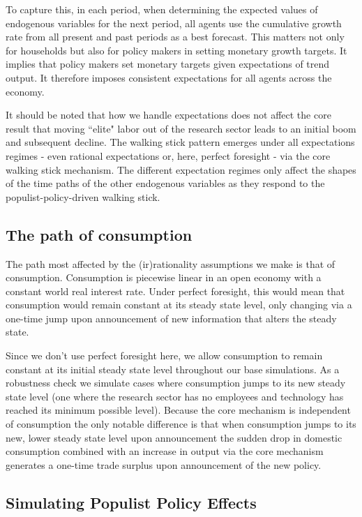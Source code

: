 \documentclass{OUP-EJ}
\begin{document}
To capture this, in each period, when determining the expected values of endogenous variables for the next period, all agents use the cumulative growth rate from all present and past periods as a best forecast. This matters not only for households but also for policy makers in setting monetary growth targets.  It implies that policy makers set monetary targets given expectations of trend output.  It therefore imposes consistent expectations for all agents across the economy.

It should be noted that how we handle expectations does not affect the core result that moving ``elite" labor out of the research sector leads to an initial boom and subsequent decline.  The walking stick pattern emerges under all expectations regimes - even rational expectations or, here, perfect foresight - via the core walking stick mechanism.  The different expectation regimes only affect the shapes of the time paths of the other endogenous variables as they respond to the populist-policy-driven walking stick.

\subsection{The path of consumption}

The path most affected by the (ir)rationality assumptions we make is that of consumption.  Consumption is piecewise linear in an open economy with a constant world real interest rate.  Under perfect foresight, this would mean that consumption would remain constant at its steady state level, only changing via a one-time jump upon announcement of new information that alters the steady state.

Since we don't use perfect foresight here, we allow consumption to remain constant at its initial steady state level throughout our base simulations.  As a robustness check we simulate cases where consumption jumps to its new steady state level (one where the research sector has no employees and technology has reached its minimum possible level). Because the core mechanism is independent of consumption the only notable difference is that when consumption jumps to its new, lower steady state level upon announcement the sudden drop in domestic consumption combined with an increase in output via the core mechanism generates a one-time trade surplus upon announcement of the new policy.

\subsection{Simulating Populist Policy Effects}
\end{document}
